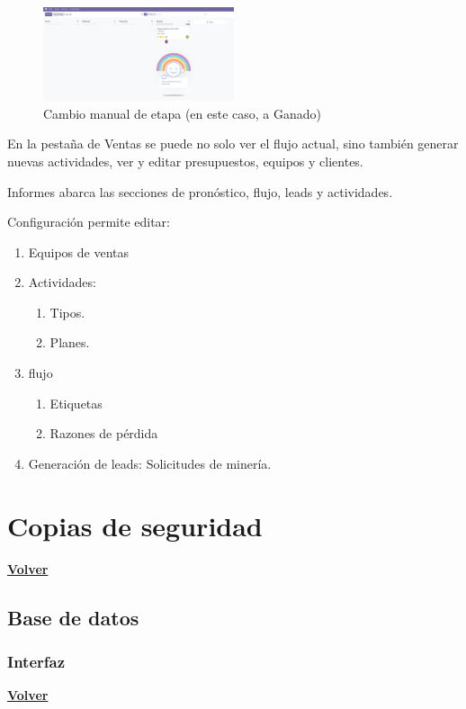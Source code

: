\documentclass[a4paper,12pt]{article}
\begin{document}
\begin{figure}[h!]
    \centering
    \includegraphics[width=0.5\textwidth]{pr2odoo75-cambioManualDeEtapa.png}
    \caption{Cambio manual de etapa (en este caso, a Ganado)}
\end{figure}
\FloatBarrier

En la pestaña de Ventas se puede no solo ver el flujo actual, sino también generar nuevas actividades, ver y editar presupuestos, equipos y clientes.

Informes abarca las secciones de pronóstico, flujo, leads y actividades.

Configuración permite editar:
\begin{enumerate}
    \item Equipos de ventas
    \item Actividades:
    \begin{enumerate}
        \item Tipos.
        \item Planes.
    \end{enumerate}
    \item flujo
    \begin{enumerate}
        \item Etiquetas
        \item Razones de pérdida
    \end{enumerate}
    \item Generación de leads: Solicitudes de minería.
\end{enumerate}

\section{Copias de seguridad}
\hyperlink{anchor-indice}{\textbf{Volver}}\\

\subsection{Base de datos}

\subsubsection{Interfaz}
\hyperlink{anchor-indice}{\textbf{Volver}}\\
\end{document}
